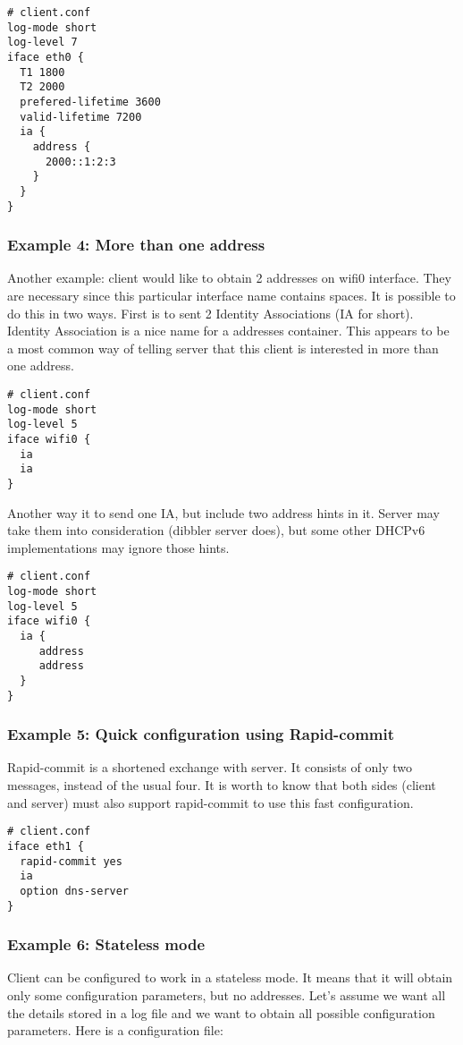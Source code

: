 \begin{lstlisting}
# client.conf
log-mode short
log-level 7
iface eth0 {
  T1 1800
  T2 2000
  prefered-lifetime 3600
  valid-lifetime 7200
  ia {
    address { 
      2000::1:2:3
    }
  }
}
\end{lstlisting}

\subsubsection{Example 4: More than one address}

Another example: client would like to obtain 2 addresses on
wifi0 interface. They are necessary since this particular interface name
contains spaces. It is possible to do this in two ways. First is to
sent 2 Identity Associations (IA for short). Identity Association is a
nice name for a addresses container. This appears to be a most common
way of telling server that this client is interested in more than one
address. 

\begin{lstlisting}
# client.conf
log-mode short
log-level 5
iface wifi0 {
  ia
  ia
}
\end{lstlisting}

Another way it to send one IA, but include two address hints in
it. Server may take them into consideration (dibbler server does), but
some other DHCPv6 implementations may ignore those hints.

\begin{lstlisting}
# client.conf
log-mode short
log-level 5
iface wifi0 {
  ia {
     address
     address
  }
}
\end{lstlisting}

\subsubsection{Example 5: Quick configuration using Rapid-commit}
Rapid-commit is a shortened exchange with server. It consists of only
two messages, instead of the usual four. It is worth to know that both sides (client
and server) must also support rapid-commit to use this fast
configuration. 

\begin{lstlisting}
# client.conf
iface eth1 {
  rapid-commit yes
  ia 
  option dns-server
}
\end{lstlisting}

\subsubsection{Example 6: Stateless mode}
Client can be configured to work in a stateless mode. It means that it
will obtain only some configuration parameters, but no
addresses. Let's assume we want all the details stored in a log file and
we want to obtain all possible configuration parameters. Here is a
configuration file:


